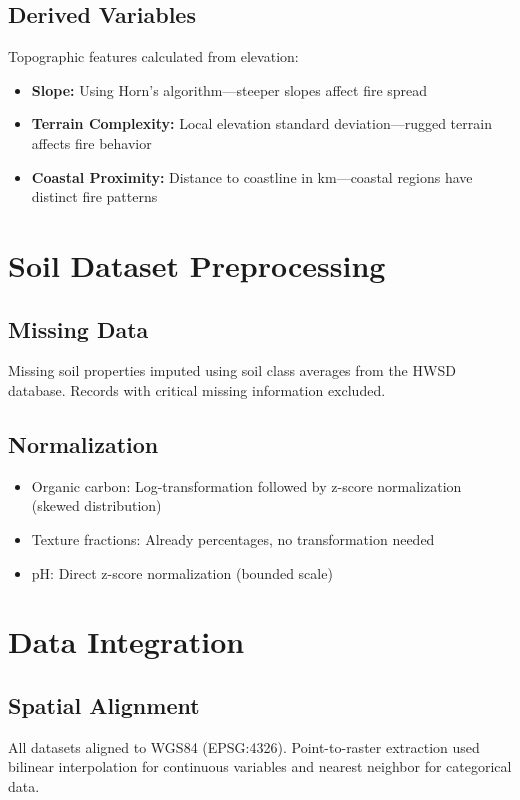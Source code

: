\subsection*{Derived Variables}
Topographic features calculated from elevation:
\begin{itemize}
    \item \textbf{Slope:} Using Horn's algorithm---steeper slopes affect fire spread
    \item \textbf{Terrain Complexity:} Local elevation standard deviation---rugged terrain affects fire behavior
    \item \textbf{Coastal Proximity:} Distance to coastline in km---coastal regions have distinct fire patterns
\end{itemize}

\section{Soil Dataset Preprocessing}

\subsection*{Missing Data}
Missing soil properties imputed using soil class averages from the HWSD database. Records with critical missing information excluded.

\subsection*{Normalization}
\begin{itemize}
    \item Organic carbon: Log-transformation followed by z-score normalization (skewed distribution)
    \item Texture fractions: Already percentages, no transformation needed
    \item pH: Direct z-score normalization (bounded scale)
\end{itemize}

\section{Data Integration}

\subsection*{Spatial Alignment}
All datasets aligned to WGS84 (EPSG:4326). Point-to-raster extraction used bilinear interpolation for continuous variables and nearest neighbor for categorical data.

